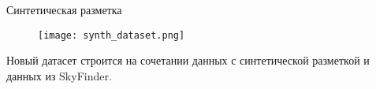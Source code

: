 
\begin{frame}{Синтетическая разметка}
\begin{figure}
\centering
\texttt{[image: synth\_dataset.png]}
\end{figure}
    Новый датасет строится на сочетании данных с синтетической разметкой и данных из SkyFinder.
\end{frame}